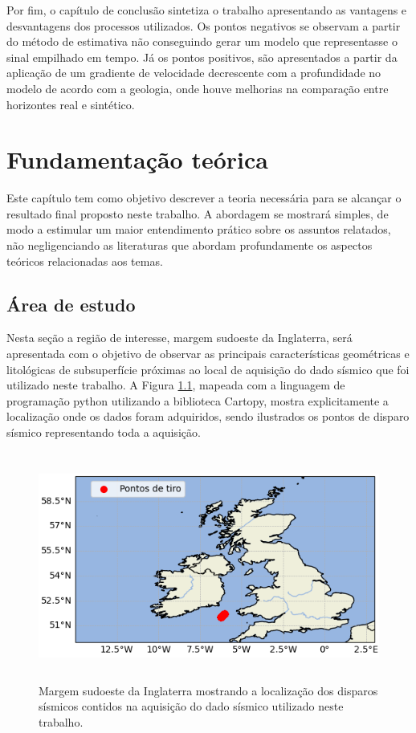 \documentclass[
	12pt,				%
	openright,			%
	oneside,			%
	a4paper,			%
	english,			%
	brazil				%
	]{abntex2}
\begin{document}
	Por fim, o capítulo de conclusão sintetiza o trabalho apresentando as vantagens e desvantagens dos processos utilizados. Os pontos negativos se observam a partir do método de estimativa não conseguindo gerar um modelo que representasse o sinal empilhado em tempo. Já os pontos positivos, são apresentados a partir da aplicação de um gradiente de velocidade decrescente com a profundidade no modelo de acordo com a geologia, onde houve melhorias na comparação entre horizontes real e sintético. 

\chapter{Fundamentação teórica}

    Este capítulo tem como objetivo descrever a teoria necessária para se alcançar o resultado final proposto neste trabalho. A abordagem se mostrará simples, de modo a estimular um maior entendimento prático sobre os assuntos relatados, não negligenciando as literaturas que abordam profundamente os aspectos teóricos relacionadas aos temas.   

\section{Área de estudo}

	Nesta seção a região de interesse, margem sudoeste da Inglaterra, será apresentada com o objetivo de observar as principais características geométricas e litológicas de subsuperfície próximas ao local de aquisição do dado sísmico que foi utilizado neste trabalho. A Figura \ref{pontosTiro}, mapeada com a linguagem de programação python utilizando a biblioteca Cartopy, mostra explicitamente a localização onde os dados foram adquiridos, sendo ilustrados os pontos de disparo sísmico representando toda a aquisição. 

    \begin{figure}[htp!]
		\centering
		\includegraphics[width=13cm,height=7.5cm]{../imagens/area_de_estudo.png}
		\caption{Margem sudoeste da Inglaterra mostrando a localização dos disparos sísmicos contidos na aquisição do dado sísmico utilizado neste trabalho.}
		\label{pontosTiro}
	\end{figure}
\end{document}
